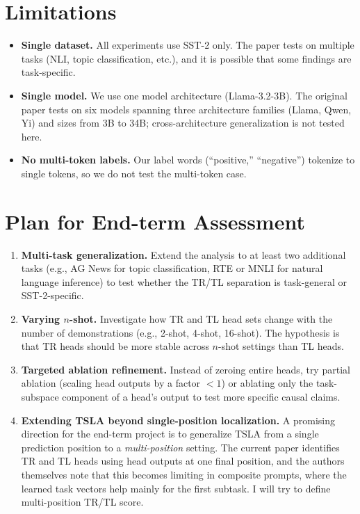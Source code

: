 \documentclass[twoside,english]{article}
\begin{document}
\section{Limitations} \label{sec:limitations}

\begin{itemize}
    \item \textbf{Single dataset.} All experiments use SST-2 only. The paper tests on multiple tasks (NLI, topic classification, etc.), and it is possible that some findings are task-specific.
    \item \textbf{Single model.} We use one model architecture (Llama-3.2-3B). The original paper tests on six models spanning three architecture families (Llama, Qwen, Yi) and sizes from 3B to 34B; cross-architecture generalization is not tested here.
    \item \textbf{No multi-token labels.} Our label words (``positive,'' ``negative'') tokenize to single tokens, so we do not test the multi-token case.
\end{itemize}

\section{Plan for End-term Assessment} \label{sec:endterm}

\begin{enumerate}
    \item \textbf{Multi-task generalization.} Extend the analysis to at least two additional tasks (e.g., AG News for topic classification, RTE or MNLI for natural language inference) to test whether the TR/TL separation is task-general or SST-2-specific.
    \item \textbf{Varying $n$-shot.} Investigate how TR and TL head sets change with the number of demonstrations (e.g., 2-shot, 4-shot, 16-shot). The hypothesis is that TR heads should be more stable across $n$-shot settings than TL heads.
    \item \textbf{Targeted ablation refinement.} Instead of zeroing entire heads, try partial ablation (scaling head outputs by a factor $< 1$) or ablating only the task-subspace component of a head's output to test more specific causal claims.
    \item \textbf{Extending TSLA beyond single-position localization.} A promising direction for the end-term project is to generalize TSLA from a single prediction position to a \emph{multi-position} setting. The current paper identifies TR and TL heads using head outputs at one final position, and the authors themselves note that this becomes limiting in composite prompts, where the learned task vectors help mainly for the first subtask. I will try to define multi-position TR/TL score.
\end{enumerate}
\end{document}

